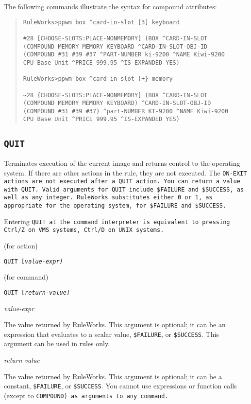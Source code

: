 {{\Example

The following commands illustrate the syntax for compound
attributes:
\begin{quote}
\begin{verbatim}
RuleWorks>ppwm box ^card-in-slot [3] keyboard

#28 [CHOOSE-SLOTS:PLACE-NONMEMORY] (BOX ^CARD-IN-SLOT
(COMPOUND MEMORY MEMORY KEYBOARD ^CARD-IN-SLOT-OBJ-ID
(COMPOUND #31 #39 #37 ^PART-NUMBER ki-9200 ^NAME Kiwi-9200
CPU Base Unit ^PRICE 999.95 ^IS-EXPANDED YES)

RuleWorks>ppwm box ^card-in-slot [+} memory

~28 {CHOOSE-SLOTS:PLACE-NONMEMORY] (BOX ^CARD-IN-SLOT
(COMPOUND MEMORY MEMORY KEYBOARD) ^CARD-IN-SLOT-OBJ-ID
(COMPOUND #31 #39 #37) ^part-NUMBER KI-9200 ^NAME Kiwi-9200
CPU Base Unit ^PRICE 999.95 ^IS-EXPANDED YES)
\end{verbatim}
\end{quote}

\subsection{\tt{QUIT}}

Terminates execution of the current image and returns control to the
operating system. If there are other actions in the rule, they are not
executed. The \tt{ON-EXIT} actions are not executed after a \tt{QUIT}
action. You can return a value with \tt{QUIT}. Valid arguments for
\tt{QUIT} include \verb|$FAILURE| and \verb|$SUCCESS|, as well as any
integer. RuleWorks substitutes either 0 or 1, as appropriate for the
operating system, for \verb|$FAILURE| and \verb|$SUCCESS|.

Entering \tt{QUIT} at the command interpreter is equivalent to
pressing Ctrl/Z on VMS systems, Ctrl/D on UNIX systems.

\Format (for action)

\tt{QUIT} [\it{value-expr}]

\Format (for command)

\tt{QUIT} [\it{return-value}]

\Arguments

\it{value-expr}

The value returned by RuleWorks. This argument is optional;
it can be an expression that evaluates to a scalar value,
\verb|$FAILURE|, or \verb|$SUCCESS|. This argument can be used in rules
only.

\it{return-value}

The value returned by RuleWorks. This argument is optional;
it can be a constant, \verb|$FAILURE|, or \verb|$SUCCESS|. You cannot use
expressions or function calls (except to \tt{COMPOUND}) as
arguments to any command.

}}

